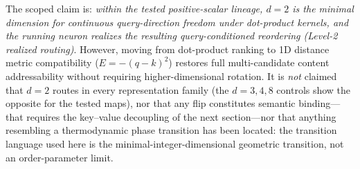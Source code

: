 The scoped claim is: \emph{within the tested positive-scalar lineage, $d=2$
is the minimal dimension for continuous query-direction freedom under dot-product kernels, and the
running neuron realizes the resulting query-conditioned reordering
(Level-2 realized routing)}. However, moving from dot-product ranking to 1D distance metric compatibility ($E = -(q-k)^2$) restores full multi-candidate content addressability without requiring higher-dimensional rotation. It is \emph{not} claimed that $d=2$ routes in
every representation family (the $d=3,4,8$ controls show the opposite for
the tested maps), nor that any flip constitutes semantic binding---that
requires the key--value decoupling of the next section---nor that anything
resembling a thermodynamic phase transition has been located: the
transition language used here is the minimal-integer-dimensional geometric
transition, not an order-parameter limit.
